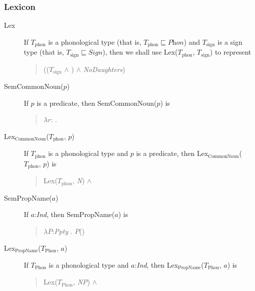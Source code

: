 \subsubsection{Lexicon}
\begin{description}
\item[\textnormal{Lex}] \mbox{}

  If $T_{\mathrm{phon}}$ is a phonological type (that is,
$T_{\mathrm{phon}}\sqsubseteq\textit{Phon}$) and $T_{\mathrm{sign}}$
is a sign type (that is, $T_{\mathrm{sign}}\sqsubseteq\textit{Sign}$), then we shall use
Lex($T_{\mathrm{phon}}$, $T_{\mathrm{sign}}$) to represent
\begin{quote}
(($T_{\mathrm{sign}}$ \d{$\wedge$}
)
\d{$\wedge$} \textit{NoDaughters})
\end{quote}

\item[\textnormal{SemCommonNoun($p$)}] \mbox{}

  If $p$ is a predicate, then SemCommonNoun($p$) is
  \begin{quote}
    $\lambda
r$:
. 
\end{quote}

\item[\textnormal{Lex$_{\mathrm{CommonNoun}}$($T_{\mathrm{phon}}$,
    $p$)}] \mbox{}

  If $T_{\mathrm{phon}}$ is a phonological type and $p$ is a
  predicate, then Lex$_{\mathrm{CommonNoun}}$($T_{\mathrm{phon}}$,
  $p$) is
  \begin{quote}
    Lex($T_{\mathrm{phon}}$, \textit{N}) \d{$\wedge$}
  \end{quote}
  
\item[\textnormal{SemPropName($a$)}] \mbox{}

  If $a$:\textit{Ind}, then SemPropName($a$) is
  \begin{quote}
    $\lambda P$:\textit{Ppty} . $P$()
  \end{quote}
  
\item[\textnormal{Lex$_{\mathrm{PropName}}$($T_{\mathrm{Phon}}$,
    $a$)}] \mbox{}

  If $T_{\mathrm{Phon}}$ is a phonological type and $a$:\textit{Ind},
  then Lex$_{\mathrm{PropName}}$($T_{\mathrm{Phon}}$,
  $a$) is
  \begin{quote}
    Lex($T_{\mathrm{Phon}}$, \textit{NP}) \d{$\wedge$}
  \end{quote}


\end{description}
